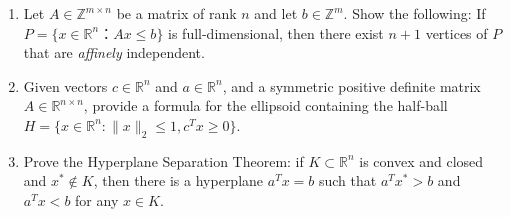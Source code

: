 \documentclass[11pt]{article}
\institute{\'Ecole Polytechnique F\'ed\'erale de Lausanne}
\DeclareMathOperator{\conv}{conv}
\newcommand{\setR}{\mathbb{R}}
\begin{document}
\makeheader

\begin{enumerate}[1)]


    
\item Let $A ∈ ℤ^{m ×n}$ be a matrix of rank $n$ and let $b ∈ ℤ^m$. Show the following: If $P = \{ x ∈ ℝ^n ： Ax ≤ b\}$ is full-dimensional, then there exist $n+1$ vertices of $P$ that are \textit{affinely} independent. 


\item Given vectors $c∈\setR^n$ and $a∈\setR^n$, and a symmetric positive definite matrix $A∈\setR^{n×n}$, provide a formula for the ellipsoid containing the half-ball $H= \{x∈\setR^n : ∥x∥_2≤1, c^Tx≥0\}$.
  
\item Prove the Hyperplane Separation Theorem: if $K ⊂\setR^n$ is convex and closed and $x^\ast\notin K$, then there
is a hyperplane $a^Tx= b$ such that $a^Tx^\ast>b$ and $a^Tx<b$ for any $x∈K$.




\end{enumerate}




  
\end{document}
